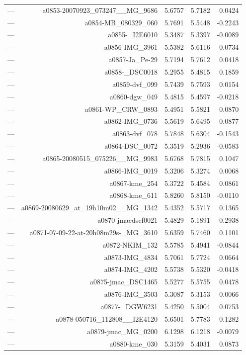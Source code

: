 \begin{table}[htbp]
\begin{tabular}{lrrrr}
— & a0853-20070923_073247__MG_9686 & 5.6757 & 5.7182 & 0.0424 \\
— & a0854-MB_080329_060 & 5.7691 & 5.5448 & -0.2243 \\
— & a0855-_I2E6010 & 5.3487 & 5.3397 & -0.0089 \\
— & a0856-IMG_3961 & 5.5382 & 5.6116 & 0.0734 \\
— & a0857-Ja_Pe-29 & 5.7194 & 5.7612 & 0.0418 \\
— & a0858-_DSC0018 & 5.2955 & 5.4815 & 0.1859 \\
— & a0859-dvf_099 & 5.7439 & 5.7593 & 0.0154 \\
— & a0860-dgw_049 & 5.4815 & 5.4597 & -0.0218 \\
— & a0861-WP_CRW_0893 & 5.4951 & 5.5821 & 0.0870 \\
— & a0862-IMG_0736 & 5.5619 & 5.6495 & 0.0877 \\
— & a0863-dvf_078 & 5.7848 & 5.6304 & -0.1543 \\
— & a0864-DSC_0072 & 5.3519 & 5.2936 & -0.0583 \\
— & a0865-20080515_075226__MG_9983 & 5.6768 & 5.7815 & 0.1047 \\
— & a0866-IMG_0019 & 5.3206 & 5.3274 & 0.0068 \\
— & a0867-kme_254 & 5.3722 & 5.4584 & 0.0861 \\
— & a0868-kme_611 & 5.8260 & 5.8150 & -0.0110 \\
— & a0869-20080629_at_19h10m02__MG_1342 & 5.4352 & 5.5717 & 0.1365 \\
— & a0870-jmacdscf0021 & 5.4829 & 5.1891 & -0.2938 \\
— & a0871-07-09-22-at-20h08m29s-_MG_3610 & 5.6359 & 5.7460 & 0.1101 \\
— & a0872-NKIM_132 & 5.5785 & 5.4941 & -0.0844 \\
— & a0873-IMG_4834 & 5.7061 & 5.7724 & 0.0664 \\
— & a0874-IMG_4202 & 5.5738 & 5.5320 & -0.0418 \\
— & a0875-jmac_DSC1465 & 5.5277 & 5.5755 & 0.0478 \\
— & a0876-IMG_3503 & 5.3087 & 5.3153 & 0.0066 \\
— & a0877-_DGW6231 & 5.4250 & 5.5004 & 0.0753 \\
— & a0878-050716_112808__I2E4120 & 5.6501 & 5.7783 & 0.1282 \\
— & a0879-jmac_MG_0200 & 6.1298 & 6.1218 & -0.0079 \\
— & a0880-kme_030 & 5.3159 & 5.4031 & 0.0873 \\

\end{tabular}
\end{table}
